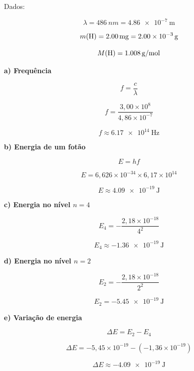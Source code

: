 \documentclass[11pt,a4paper]{article}
\begin{document}
	\begin{tcolorbox}[
		enhanced,
		breakable,
		colback=eulightorange,
		colframe=euorange,
		title=\textbf{Resolução},
		fonttitle=\bfseries
		]
		
		Dados:
		
		\[
		\lambda=\SI{486}{nm}
		=
		\SI{4,86e-7}{\meter}
		\]
		
		\[
		m(\ce{H})=\SI{2.00}{mg}
		=
		\SI{2.00e-3}{g}
		\]
		
		\[
		M(\ce{H})=\SI{1.008}{g\per mol}
		\]
		
		\textbf{a) Frequência}
		
		\[
		f=\frac{c}{\lambda}
		\]
		
		\[
		f=
		\frac{3,00\times10^8}
		{4,86\times10^{-7}}
		\]
		
		\[
		\boxed{
			f\approx\SI{6,17e14}{\hertz}
		}
		\]
		
		\vspace{3mm}
		
		\textbf{b) Energia de um fotão}
		
		\[
		E=hf
		\]
		
		\[
		E=
		6,626\times10^{-34}
		\times
		6,17\times10^{14}
		\]
		
		\[
		\boxed{
			E\approx\SI{4,09e-19}{\joule}
		}
		\]
		
		\vspace{3mm}
		
		\textbf{c) Energia no nível \(n=4\)}
		
		\[
		E_4=
		-\frac{2,18\times10^{-18}}{4^2}
		\]
		
		\[
		\boxed{
			E_4\approx\SI{-1,36e-19}{\joule}
		}
		\]
		
		\vspace{3mm}
		
		\textbf{d) Energia no nível \(n=2\)}
		
		\[
		E_2=
		-\frac{2,18\times10^{-18}}{2^2}
		\]
		
		\[
		\boxed{
			E_2=\SI{-5,45e-19}{\joule}
		}
		\]
		
		\vspace{3mm}
		
		\textbf{e) Variação de energia}
		
		\[
		\Delta E=E_2-E_4
		\]
		
		\[
		\Delta E
		=
		-5,45\times10^{-19}
		-
		(-1,36\times10^{-19})
		\]
		
		\[
		\boxed{
			\Delta E\approx\SI{-4,09e-19}{\joule}
		}
		\]
		
		\vspace{3mm}
		

\end{tcolorbox}
\end{document}
